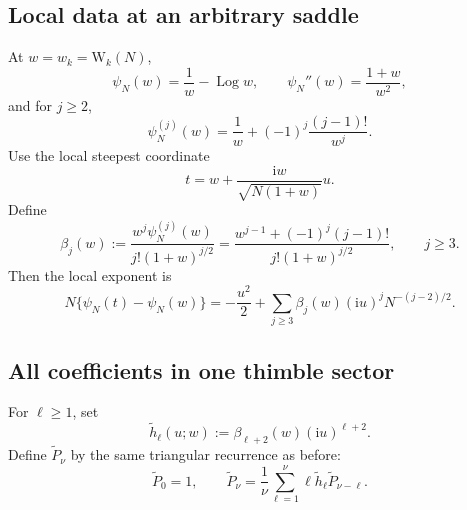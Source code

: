 \documentclass[11pt,a4paper]{article}
\theoremstyle{definition}
\newcommand{\W}{\mathrm W}
\newcommand{\ii}{\mathrm i}
\newcommand{\Log}{\operatorname{Log}}
\begin{document}
\subsection{Local data at an arbitrary saddle}

At $w=w_k=\W_k(N)$,
\begin{equation}\label{eq:psi-at-saddle}
 \psi_N(w)=\frac1w-\Log w,
 \qquad
 \psi_N''(w)=\frac{1+w}{w^2},
\end{equation}
and for $j\ge2$,
\begin{equation}\label{eq:psi-derivs}
 \psi_N^{(j)}(w)=\frac1w+(-1)^j\frac{(j-1)!}{w^j}.
\end{equation}
Use the local steepest coordinate
\begin{equation}\label{eq:vertical-coordinate}
 t=w+\frac{\ii w}{\sqrt{N(1+w)}}u.
\end{equation}
Define
\begin{equation}\label{eq:beta}
 \beta_j(w):=
 \frac{w^j\psi_N^{(j)}(w)}{j!(1+w)^{j/2}}
 =\frac{w^{j-1}+(-1)^j(j-1)!}{j!(1+w)^{j/2}},
 \qquad j\ge3.
\end{equation}
Then the local exponent is
\begin{equation}\label{eq:vertical-scaled-phase}
 N\{\psi_N(t)-\psi_N(w)\}
 =-\frac{u^2}{2}
 +\sum_{j\ge3}\beta_j(w)(\ii u)^jN^{-(j-2)/2}.
\end{equation}

\subsection{All coefficients in one thimble sector}

For $\ell\ge1$, set
\begin{equation}\label{eq:tilde-h}
 \widetilde h_\ell(u;w):=\beta_{\ell+2}(w)(\ii u)^{\ell+2}.
\end{equation}
Define $\widetilde P_\nu$ by the same triangular recurrence as before:
\begin{equation}\label{eq:tilde-P-rec}
 \widetilde P_0=1,
 \qquad
 \widetilde P_\nu=\frac1\nu\sum_{\ell=1}^{\nu}
 \ell\widetilde h_\ell\widetilde P_{\nu-\ell}.
\end{equation}
\end{document}
